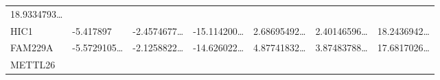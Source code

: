 \documentclass[
]{article}
\begin{document}
\begin{longtable}[]{@{}lllllll@{}}
\begin{minipage}[t]{0.12\columnwidth}
18.9334793\ldots{}\strut
\end{minipage}\tabularnewline
\begin{minipage}[t]{0.08\columnwidth}\raggedright
HIC1\strut
\end{minipage} & \begin{minipage}[t]{0.12\columnwidth}\raggedright
-5.417897\strut
\end{minipage} & \begin{minipage}[t]{0.12\columnwidth}\raggedright
-2.4574677\ldots{}\strut
\end{minipage} & \begin{minipage}[t]{0.12\columnwidth}\raggedright
-15.114200\ldots{}\strut
\end{minipage} & \begin{minipage}[t]{0.12\columnwidth}\raggedright
2.68695492\ldots{}\strut
\end{minipage} & \begin{minipage}[t]{0.12\columnwidth}\raggedright
2.40146596\ldots{}\strut
\end{minipage} & \begin{minipage}[t]{0.12\columnwidth}\raggedright
18.2436942\ldots{}\strut
\end{minipage}\tabularnewline
\begin{minipage}[t]{0.08\columnwidth}\raggedright
FAM229A\strut
\end{minipage} & \begin{minipage}[t]{0.12\columnwidth}\raggedright
-5.5729105\ldots{}\strut
\end{minipage} & \begin{minipage}[t]{0.12\columnwidth}\raggedright
-2.1258822\ldots{}\strut
\end{minipage} & \begin{minipage}[t]{0.12\columnwidth}\raggedright
-14.626022\ldots{}\strut
\end{minipage} & \begin{minipage}[t]{0.12\columnwidth}\raggedright
4.87741832\ldots{}\strut
\end{minipage} & \begin{minipage}[t]{0.12\columnwidth}\raggedright
3.87483788\ldots{}\strut
\end{minipage} & \begin{minipage}[t]{0.12\columnwidth}\raggedright
17.6817026\ldots{}\strut
\end{minipage}\tabularnewline
\begin{minipage}[t]{0.08\columnwidth}\raggedright
METTL26\strut
\end{minipage} & \begin{minipage}[t]{0.12\columnwidth}\raggedright

\end{minipage}
\end{longtable}
\end{document}

